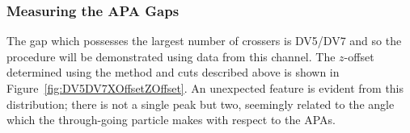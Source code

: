 \subsubsection{Measuring the APA Gaps}\label{sec:MeasuringAPAGaps}

The gap which possesses the largest number of crossers is DV5/DV7 and so the procedure will be demonstrated using data from this channel.  The $z$-offset determined using the method and cuts described above is shown in Figure~\ref{fig:DV5DV7XOffsetZOffset}.  An unexpected feature is evident from this distribution; there is not a single peak but two, seemingly related to the angle which the through-going particle makes with respect to the APAs.

